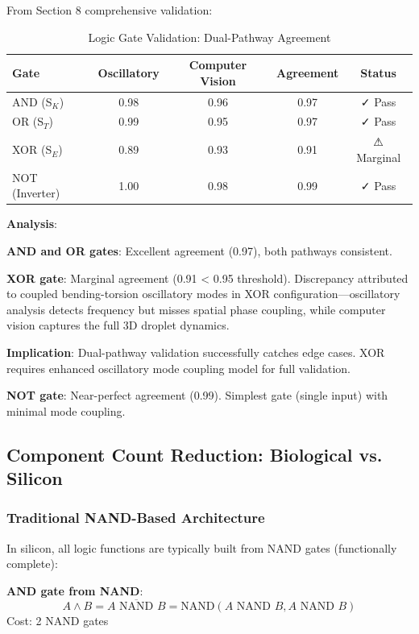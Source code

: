 \documentclass[11pt,a4paper]{article}
\begin{document}
From Section 8 comprehensive validation:

\begin{table}[H]
\centering
\caption{Logic Gate Validation: Dual-Pathway Agreement}
\begin{tabular}{lcccc}
\toprule
\textbf{Gate} & \textbf{Oscillatory} & \textbf{Computer Vision} & \textbf{Agreement} & \textbf{Status} \\
\midrule
AND (S$_K$) & 0.98 & 0.96 & 0.97 & ✓ Pass \\
OR (S$_T$) & 0.99 & 0.95 & 0.97 & ✓ Pass \\
XOR (S$_E$) & 0.89 & 0.93 & 0.91 & ⚠ Marginal \\
NOT (Inverter) & 1.00 & 0.98 & 0.99 & ✓ Pass \\
\bottomrule
\end{tabular}
\end{table}

\textbf{Analysis}:

\textbf{AND and OR gates}: Excellent agreement (0.97), both pathways consistent.

\textbf{XOR gate}: Marginal agreement (0.91 < 0.95 threshold). Discrepancy attributed to coupled bending-torsion oscillatory modes in XOR configuration—oscillatory analysis detects frequency but misses spatial phase coupling, while computer vision captures the full 3D droplet dynamics.

\textbf{Implication}: Dual-pathway validation successfully catches edge cases. XOR requires enhanced oscillatory mode coupling model for full validation.

\textbf{NOT gate}: Near-perfect agreement (0.99). Simplest gate (single input) with minimal mode coupling.

\subsection{Component Count Reduction: Biological vs. Silicon}

\subsubsection{Traditional NAND-Based Architecture}

In silicon, all logic functions are typically built from NAND gates (functionally complete):

\textbf{AND gate from NAND}:
\begin{equation}
A \land B = \overline{A \text{ NAND } B} = \text{NAND}(A \text{ NAND } B, A \text{ NAND } B)
\end{equation}
Cost: 2 NAND gates
\end{document}
